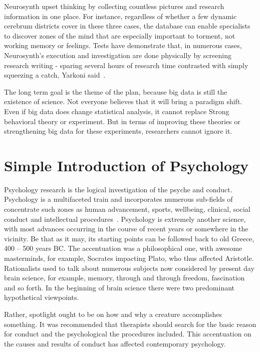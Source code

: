 Neurosynth upset thinking by collecting countless 
pictures and research information in one place. For instance, 
regardless of whether a few 
dynamic cerebrum districts cover in these three cases, the database
 can enable specialists to discover zones of the mind that are 
especially important 
to torment, not working memory or feelings. Tests have demonstrate
 that, in numerous 
cases, Neurosynth's execution and investigation are done physically
 by screening research writing - sparing several hours of research 
time contrasted with simply squeezing a catch, Yarkoni said~\cite{editor00}.

The long term goal is the theme of the plan, because big data is 
still the existence of science. Not everyone believes that it will 
bring a paradigm shift. Even if big data does change statistical analysis, 
it cannot replace Strong behavioral theory or experiment. But in terms of 
improving these theories or strengthening big data for these experiments, 
researchers cannot ignore it.

\section{Simple Introduction of Psychology}

Psychology research is the logical investigation of the psyche and
 conduct. Psychology is a multifaceted train and incorporates 
numerous sub-fields of concentrate such zones as human advancement,
 sports, wellbeing, clinical, social conduct and intellectual 
procedures~\cite{editor01}. Psychology is extremely another 
science, with most advances occurring in the course of recent years
 or somewhere in the vicinity. Be that as it may, its starting 
points can be followed back to old Greece, 400 – 500 years BC. 
The accentuation was a philosophical one, with awesome masterminds,
 for example, Socrates impacting Plato, who thus affected 
Aristotle. Rationalists used to talk about numerous subjects now 
considered by present day brain science, for example, memory, 
through and through freedom, fascination and so forth. In the 
beginning of brain science there were two predominant hypothetical
 viewpoints. 

Rather, spotlight ought to be on how and why a creature 
accomplishes something. It was recommended that therapists should 
search for the basic reason for conduct and the psychological the 
procedures included. This accentuation on the causes and results of
 conduct has affected contemporary psychology.

